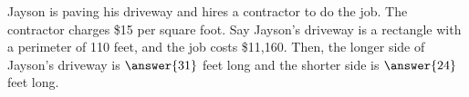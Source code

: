 \documentclass{ximera}
\author{Kenneth Berglund}
\begin{document}
\begin{exercise}
Jayson is paving his driveway and hires a contractor to do the job. The contractor charges \$15 per square foot. Say Jayson's driveway is a rectangle with a perimeter of 110 feet, and the job costs \$11,160. Then, the longer side of Jayson's driveway is $\answer{31}$ feet long and the shorter side is $\answer{24}$ feet long.


\end{exercise}
\end{document}
